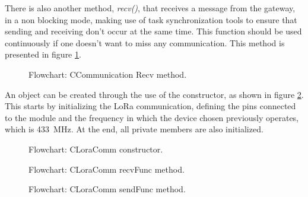 There is also another method, \textit{recv()}, that receives a message from the gateway, in a non blocking mode, making use of task synchronization tools to ensure that sending and receiving don't occur at the same time. This function should be used continuously if one doesn't want to miss any communication. This method is presented in figure \ref{fig:CCommunicationrecv}.

\begin{figure}[H]
	\centering
	\caption{Flowchart: CCommunication Recv method.}
	\label{fig:CCommunicationrecv}
\end{figure}

\clearpage
{}

An object can be created through the use of the constructor, as shown in figure \ref{fig:LoraComm}.
This starts by initializing the LoRa communication, defining the pins connected to the module and the frequency in which the device chosen previously operates, which is 433~MHz. At the end, all private members are also initialized.

\begin{figure}[H]
	\centering
	\caption{Flowchart: CLoraComm constructor.}
	\label{fig:LoraComm}
\end{figure}

\begin{figure}[H]
	\centering
	\caption{Flowchart: CLoraComm recvFunc method.}
	\label{fig:CLoraCommrecvfunc}
\end{figure}

\begin{figure}[H]
	\centering
	\caption{Flowchart: CLoraComm sendFunc method.}
	\label{fig:CLoraCommsendfunc}
\end{figure}


\clearpage
{}


